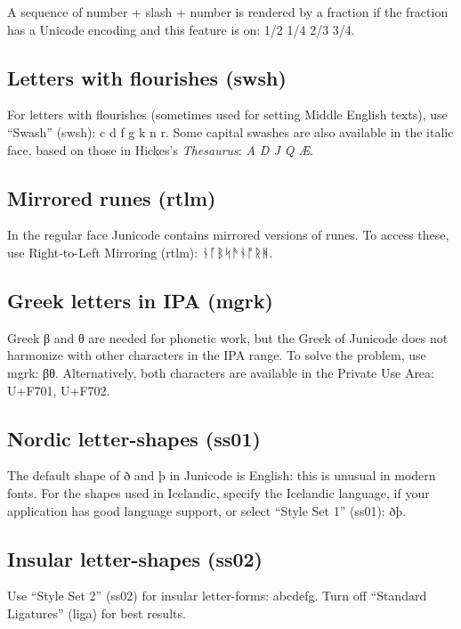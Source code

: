 \documentclass[12pt,a4paper,openany]{book}
\begin{document}
A sequence of number + slash + number is rendered by a fraction if the
fraction has a Unicode encoding and this feature is on:
{ 1/2 1/4 2/3 3/4}.

\subsection*{Letters with flourishes (swsh)}
For letters with flourishes (sometimes used for setting Middle English
texts), use “Swash” (swsh):
{c d f g k n r}. Some capital swashes are also
available in the italic face, based on those in Hickes's \textit{Thesaurus}:
{\textit{A D J Q Æ}}.

\subsection*{Mirrored runes (rtlm)}

In the regular face Junicode
contains mirrored versions of runes. To access these, use
Right-to-Left Mirroring (rtlm): {
  ᚾᚪᛒᛋᚫᚾᚩᚱᚻ.}

\subsection*{Greek letters in IPA (mgrk)}

Greek β and θ are needed for phonetic work, but the Greek of Junicode
does not harmonize with other characters in the IPA range. To solve
the problem, use mgrk: {βθ}. Alternatively,
both characters are available in the Private Use Area: U+F701, U+F702.

\subsection*{Nordic letter-shapes (ss01)}

The default shape of ð and þ in Junicode is English: this is unusual in
modern fonts. For the shapes used in Icelandic, specify the Icelandic
language, if your application has good language support, or select
“Style Set 1” (ss01): { ðþ}.

\subsection*{Insular letter-shapes (ss02)}

Use “Style Set 2” (ss02) for insular letter-forms:
{ abcdefg.} Turn off “Standard
Ligatures” (liga) for best results.
\end{document}
